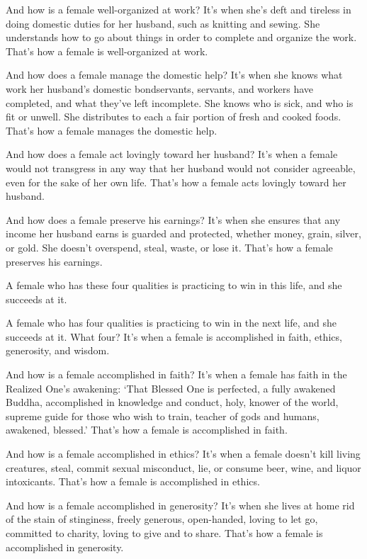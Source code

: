 \documentclass[12pt,openany]{book}%
\begin{document}
And how is a female well-organized at work? It’s when she’s deft and tireless in doing domestic duties for her husband, such as knitting and sewing. She understands how to go about things in order to complete and organize the work. That’s how a female is well-organized at work. 

And how does a female manage the domestic help? It’s when she knows what work her husband’s domestic bondservants, servants, and workers have completed, and what they’ve left incomplete. She knows who is sick, and who is fit or unwell. She distributes to each a fair portion of fresh and cooked foods. That’s how a female manages the domestic help. 

And how does a female act lovingly toward her husband? It’s when a female would not transgress in any way that her husband would not consider agreeable, even for the sake of her own life. That’s how a female acts lovingly toward her husband. 

And how does a female preserve his earnings? It’s when she ensures that any income her husband earns is guarded and protected, whether money, grain, silver, or gold. She doesn’t overspend, steal, waste, or lose it. That’s how a female preserves his earnings. 

A female who has these four qualities is practicing to win in this life, and she succeeds at it. 

A female who has four qualities is practicing to win in the next life, and she succeeds at it. What four? It’s when a female is accomplished in faith, ethics, generosity, and wisdom. 

And how is a female accomplished in faith? It’s when a female has faith in the Realized One’s awakening: ‘That Blessed One is perfected, a fully awakened Buddha, accomplished in knowledge and conduct, holy, knower of the world, supreme guide for those who wish to train, teacher of gods and humans, awakened, blessed.’ That’s how a female is accomplished in faith. 

And how is a female accomplished in ethics? It’s when a female doesn’t kill living creatures, steal, commit sexual misconduct, lie, or consume beer, wine, and liquor intoxicants. That’s how a female is accomplished in ethics. 

And how is a female accomplished in generosity? It’s when she lives at home rid of the stain of stinginess, freely generous, open-handed, loving to let go, committed to charity, loving to give and to share. That’s how a female is accomplished in generosity. 
\end{document}
